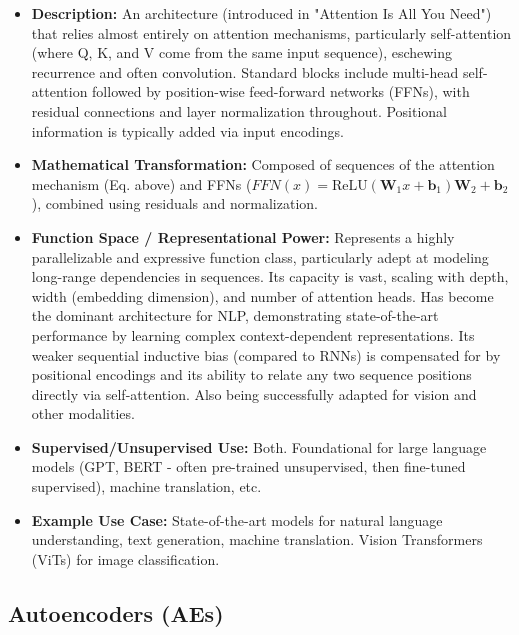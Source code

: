 \documentclass{article}
\newcommand{\bW}{\bm{W}}
\newcommand{\bb}{\bm{b}}
\begin{document}
\begin{itemize}
    \item \textbf{Description:} An architecture (introduced in "Attention Is All You Need") that relies almost entirely on attention mechanisms, particularly self-attention (where Q, K, and V come from the same input sequence), eschewing recurrence and often convolution. Standard blocks include multi-head self-attention followed by position-wise feed-forward networks (FFNs), with residual connections and layer normalization throughout. Positional information is typically added via input encodings.
    \item \textbf{Mathematical Transformation:} Composed of sequences of the attention mechanism (Eq. above) and FFNs ($FFN(x) = \text{ReLU}(\bW_1 x + \bb_1)\bW_2 + \bb_2$), combined using residuals and normalization.
    \item \textbf{Function Space / Representational Power:} Represents a highly parallelizable and expressive function class, particularly adept at modeling long-range dependencies in sequences. Its capacity is vast, scaling with depth, width (embedding dimension), and number of attention heads. Has become the dominant architecture for NLP, demonstrating state-of-the-art performance by learning complex context-dependent representations. Its weaker sequential inductive bias (compared to RNNs) is compensated for by positional encodings and its ability to relate any two sequence positions directly via self-attention. Also being successfully adapted for vision and other modalities.
    \item \textbf{Supervised/Unsupervised Use:} Both. Foundational for large language models (GPT, BERT - often pre-trained unsupervised, then fine-tuned supervised), machine translation, etc.
    \item \textbf{Example Use Case:} State-of-the-art models for natural language understanding, text generation, machine translation. Vision Transformers (ViTs) for image classification.
\end{itemize}

\subsection{Autoencoders (AEs)}
\end{document}
